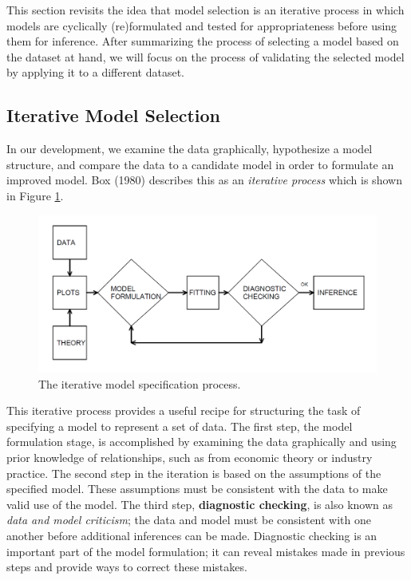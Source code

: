 \documentclass[]{book}
\theoremstyle{definition}
\theoremstyle{definition}
\theoremstyle{definition}
\theoremstyle{remark}
\begin{document}
This section revisits the idea that model selection is an iterative
process in which models are cyclically (re)formulated and tested for
appropriateness before using them for inference. After summarizing the
process of selecting a model based on the dataset at hand, we will focus
on the process of validating the selected model by applying it to a
different dataset.

\subsection{Iterative Model Selection}\label{iterative-model-selection}

In our development, we examine the data graphically, hypothesize a model
structure, and compare the data to a candidate model in order to
formulate an improved model. Box (1980) describes this as an
\emph{iterative process} which is shown in Figure \ref{fig:Iterative}.

\begin{figure}

{\centering \includegraphics[width=0.8\linewidth]{Figures/F5Iterative} 

}

\caption{The iterative model specification process.}\label{fig:Iterative}
\end{figure}

This iterative process provides a useful recipe for structuring the task
of specifying a model to represent a set of data. The first step, the
model formulation stage, is accomplished by examining the data
graphically and using prior knowledge of relationships, such as from
economic theory or industry practice. The second step in the iteration
is based on the assumptions of the specified model. These assumptions
must be consistent with the data to make valid use of the model. The
third step, \textbf{diagnostic checking}, is also known as \emph{data
and model criticism}; the data and model must be consistent with one
another before additional inferences can be made. Diagnostic checking is
an important part of the model formulation; it can reveal mistakes made
in previous steps and provide ways to correct these mistakes.
\end{document}
